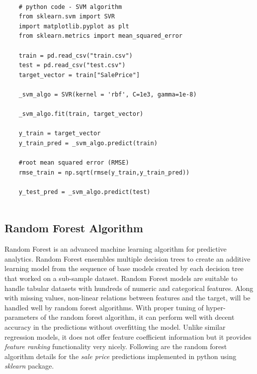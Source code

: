 \documentclass[sigconf]{acmart}
\begin{document}
	\begin{verbatim}
	
	# python code - SVM algorithm
	from sklearn.svm import SVR
	import matplotlib.pyplot as plt
	from sklearn.metrics import mean_squared_error
	
	train = pd.read_csv("train.csv")
	test = pd.read_csv("test.csv")
	target_vector = train["SalePrice"]
	
	_svm_algo = SVR(kernel = 'rbf', C=1e3, gamma=1e-8)	
	
	_svm_algo.fit(train, target_vector)    
	
	y_train = target_vector
	y_train_pred = _svm_algo.predict(train)
	
	#root mean squared error (RMSE)
	rmse_train = np.sqrt(rmse(y_train,y_train_pred))
	
	y_test_pred = _svm_algo.predict(test)
	
	\end{verbatim}
	
	
	\subsection{Random Forest Algorithm}
	
	Random Forest is an advanced machine learning algorithm for predictive analytics. Random Forest ensembles multiple decision trees to create an additive learning model from the sequence of base models created by each decision tree that worked on a sub-sample dataset. Random Forest models are suitable to handle tabular datasets with hundreds of numeric and categorical features. Along with missing values, non-linear relations between features and the target, will be handled well by random forest algorithms. With proper tuning of hyper-parameters of the random forest algorithm, it can perform well with decent accuracy in the predictions without overfitting the model. Unlike similar regression models, it does not offer feature coefficient information but it provides {\em feature ranking} functionality very nicely. Following are the random forest algorithm details for the {\em sale price} predictions implemented in python using {\em sklearn} package.
	
\end{document}
